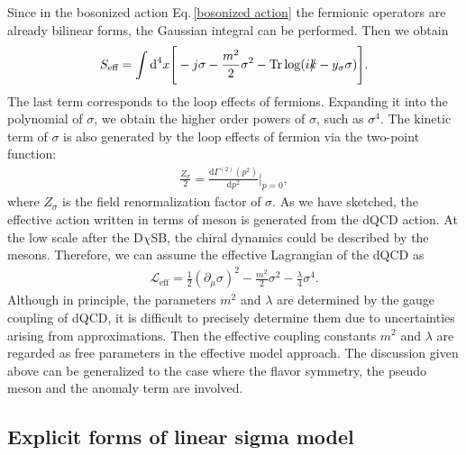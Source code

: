 \documentclass[a4paper,preprint,superscriptaddress,preprintnumbers,nofootinbib]{revtex4}
\newcommand{\Slash}[1]{{\ooalign{\hfil/\hfil\crcr$#1$}}}
\newcommand{\al}[1]{\begin{align}#1\end{align}}
\newcommand{\p}{\partial}
\newcommand{\df}{\text{d}}
\newcommand{\fn}[1]{\!\left(#1\right)}
\newcommand{\Lag}{\mathcal L}
\begin{document}
\begin{appendix}
Since in the bosonized action Eq.\,\eqref{bosonized action} the fermionic operators are already bilinear forms, the Gaussian integral can be performed.
Then we obtain
\al{
S_\text{eff}
=\int \df^4x
\Bigg[  
-j\sigma -\frac{m^2}{2}\sigma^2 
-\text{Tr}\log (i{\Slash k}-y_\sigma \sigma)
 \Bigg].
}
The last term corresponds to the loop effects of fermions.
Expanding it into the polynomial of $\sigma$, we obtain the higher order powers of $\sigma$, such as $\sigma^4$.
The kinetic term of $\sigma$ is also generated by the loop effects of fermion via the two-point function:
\al{
\frac{Z_\sigma}{2}= \frac{\df\Gamma^{(2)}\fn{p^2}}{\df p^2}\Bigg|_{p=0},
}
where $Z_\sigma$ is the field renormalization factor of $\sigma$.
As we have sketched, the effective action written in terms of meson is generated from the dQCD action.
At the low scale after the D$\chi$SB, the chiral dynamics could be described by the mesons.
Therefore, we can assume the effective Lagrangian of the dQCD as
\al{
\Lag_\text{eff}=\frac{1}{2}(\p_\mu \sigma)^2 -\frac{m^2}{2}\sigma^2-\frac{\lambda}{4}\sigma^4.
}
Although in principle, the parameters $m^2$ and $\lambda$ are determined by the gauge coupling of  dQCD, it is difficult to precisely determine them due to uncertainties arising from approximations.
Then the effective coupling constants $m^2$ and $\lambda$ are regarded as free parameters in the effective model approach.
The discussion given above can be generalized to the case where the flavor symmetry, the pseudo meson and the anomaly term are involved. 

\subsection{Explicit forms of linear sigma model}

\end{appendix}
\end{document}
